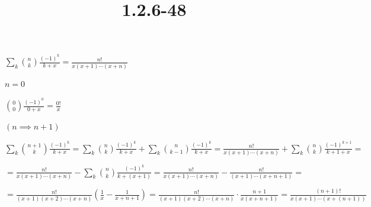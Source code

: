 \documentclass{article}
\title{1.2.6-48}
\begin{document}
\maketitle

$\sum_k \binom{n}{k} \frac{(-1)^k}{k+x} = \frac{n!}{x(x+1)\cdots(x+n)}$

$n = 0$

$\binom{0}{0} \frac{(-1)^0}{0+x} = \frac{0!}{x}$

$(n \implies n + 1)$

$\sum_k \binom{n+1}{k} \frac{(-1)^k}{k+x} = \sum_k \binom{n}{k} \frac{(-1)^k}{k+x} + \sum_k \binom{n}{k-1} \frac{(-1)^k}{k+x} = \frac{n!}{x(x+1)\cdots(x+n)} + \sum_k \binom{n}{k}\frac{(-1)^{k+1}}{k+1+x} =$

$= \frac{n!}{x(x+1)\cdots(x+n)} - \sum_k \binom{n}{k}\frac{(-1)^{k}}{k+(x+1)} = \frac{n!}{x(x+1)\cdots(x+n)} - \frac{n!}{(x+1)\cdots(x+n+1)} =$

$= \frac{n!}{(x+1)(x+2)\cdots(x+n)} (\frac{1}{x} - \frac{1}{x+n+1}) = \frac{n!}{(x+1)(x+2)\cdots(x+n)} \cdot \frac{n+1}{x(x+n+1)} = \frac{(n+1)!}{x(x+1)\cdots(x+(n+1))}$
\end{document}
